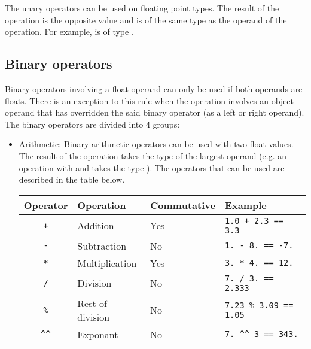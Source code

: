 The \token{-} unary operators can be used on floating point types. The result
of the operation is the opposite value and is of the same type as the operand of
the operation. For example,  is of type .

\subsection{Binary operators}
\label{sec:orga43d13a}

Binary operators involving a float operand can only be used if both operands are
floats. There is an exception to this rule when the operation involves an object
operand that has overridden the said binary operator (as a left or right
operand). The binary operators are divided into 4 groups:

\begin{itemize}
\item Arithmetic: Binary arithmetic operators can be used with two float values.
  The result of the operation takes the type of the largest operand (e.g. an
  operation with  and  takes the type ). The
  operators that can be used are described in the table below.

  \begin{center}
    \vspace{-20pt}
    \begin{adjustbox}{max width=1.0\linewidth}
      \begin{tabular}{|c|lll|}
        \hline
        Operator & Operation & Commutative & Example\\[0pt]
        \hline
        \hline
        \texttt{+} & Addition & Yes & \texttt{1.0 + 2.3 == 3.3}\\[0pt]
        \texttt{-} & Subtraction & No & \texttt{1. - 8. == -7.}\\[0pt]
        \texttt{*} & Multiplication & Yes & \texttt{3. * 4. == 12.}\\[0pt]
        \texttt{/} & Division & No & \texttt{7. / 3. == 2.333}\\[0pt]
        \texttt{\%} & Rest of division & No & \texttt{7.23 \% 3.09 == 1.05}\\[0pt]
        \texttt{\textasciicircum{}\textasciicircum{}} & Exponant & No & \texttt{7. \textasciicircum{}\textasciicircum{} 3 == 343.}\\[0pt]
        \hline
      \end{tabular}
    \end{adjustbox}
  \end{center}


\end{itemize}
